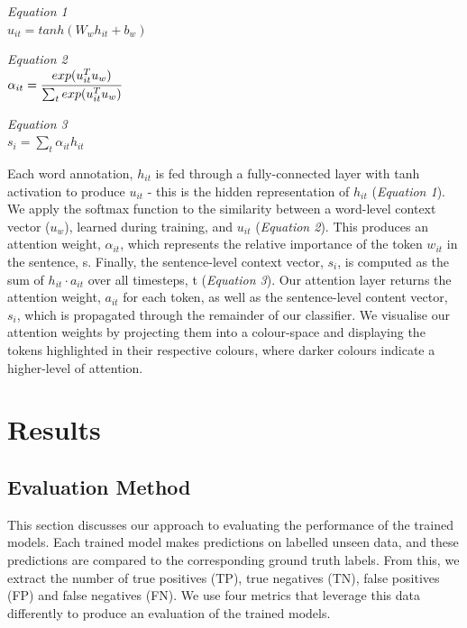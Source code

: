 \documentclass[12pt,a4paper]{article}
\begin{document}
\begin{center}
	\hspace{25pt}\begin{minipage}{0.35\textwidth}
		\textit{Equation 1}\hfill\\\vspace{16pt}
		$u_{it} = tanh(W_wh_{it} + b_w)$
	\end{minipage}
	\begin{minipage}{0.29\textwidth}
		\textit{Equation 2}\hfill\\ $\alpha_{it} = \cfrac{exp(u_{it}^{T}u_w)}{\sum_{t}exp(u_{it}^{T}u_w)}$
	\end{minipage}
	\hspace{5pt}
	\begin{minipage}{0.27\textwidth}
		\textit{Equation 3}\hfill\\\vspace{16pt}$s_i = \sum_{t}\alpha_{it}h_{it}$
	\end{minipage}
\end{center}

\noindent Each word annotation, $h_{it}$ is fed through a fully-connected layer with tanh activation to produce $u_{it}$ - this is the hidden representation of $h_{it}$ (\textit{Equation 1}). We apply the softmax function to the similarity between a word-level context vector ($u_w$), learned during training, and $u_{it}$ (\textit{Equation 2}). This produces an attention weight, $\alpha_{it}$, which represents the relative importance of the token $w_{it}$ in the sentence, s. Finally, the sentence-level context vector, $s_i$, is computed as the sum of $h_{it} \cdot a_{it}$ over all timesteps, t (\textit{Equation 3}). Our attention layer returns the attention weight, $a_{it}$ for each token, as well as the sentence-level content vector, $s_i$, which is propagated through the remainder of our classifier. We visualise our attention weights by projecting them into a colour-space and displaying the tokens highlighted in their respective colours, where darker colours indicate a higher-level of attention.

\section{Results}\vspace{-8pt}
\subsection{Evaluation Method}\vspace{-5pt}
\noindent This section discusses our approach to evaluating the performance of the trained models. Each trained model makes predictions on labelled unseen data, and these predictions are compared to the corresponding ground truth labels. From this, we extract the number of true positives (TP), true negatives (TN), false positives (FP) and false negatives (FN). We use four metrics that leverage this data differently to produce an evaluation of the trained models.\vspace{-10pt}
\end{document}

